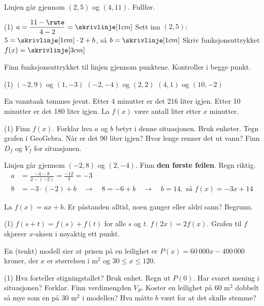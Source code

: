 Linjen går gjennom $(2, 5)$ og $(4, 11)$. Fullfør.
\begin{tasks}(1)
  \task $a = \dfrac{11 - \rute}{4 - 2} = \skrivlinje[1cm]$
  \task Sett inn $(2, 5)$: \ $5 = \skrivlinje[1cm] \cdot 2 + b$, så $b = \skrivlinje[1cm]$
  \task Skriv funksjonsuttrykket $f(x) = \skrivlinje[3cm]$
\end{tasks}


Finn funksjonsuttrykket til linjen gjennom punktene. Kontroller i begge punkt.
\begin{tasks}(1)
  \task $(-2, 9)$ og $(1, -3)$
  \task $(-2, -4)$ og $(2, 2)$
  \task $(4, 1)$ og $(10, -2)$
\end{tasks}

En vanntank tømmes jevnt. Etter 4 minutter er det 216 liter igjen. Etter 10 minutter er det 180 liter igjen.
La $f(x)$ være antall liter etter $x$ minutter.
\begin{tasks}(1)
  \task Finn $f(x)$.
  \task Forklar hva $a$ og $b$ betyr i denne situasjonen. Bruk enheter.
  \task Tegn grafen i GeoGebra. Når er det 90 liter igjen?
  \task Hvor lenge renner det ut vann? Finn $D_f$ og $V_f$ for situasjonen.
\end{tasks}

Linjen går gjennom $(-2, 8)$ og $(2, -4)$. Finn \textbf{den første feilen}. Regn riktig.
\begin{align*}
a &= \frac{-4 - 8}{2 - (-2)} = \frac{-12}{4} = -3\\
8 &= -3 \cdot (-2) + b \quad\longrightarrow\quad 8 = -6 + b \quad\longrightarrow\quad b = 14, \text{ så } f(x) = -3x + 14
\end{align*}


La $f(x) = ax + b$. Er påstanden alltid, noen ganger eller aldri sann? Begrunn.
\begin{tasks}(1)
  \task $f(s+t) = f(s) + f(t)$ for alle $s$ og $t$.
  \task $f(2x) = 2f(x)$.
  \task Grafen til $f$ skjærer $x$-aksen i nøyaktig ett punkt.
\end{tasks}

En (tenkt) modell sier at prisen på en leilighet er $P(x) = 60\,000x - 400\,000$ kroner, der $x$ er størrelsen i m$^2$ og $30 \le x \le 120$.
\begin{tasks}(1)
  \task Hva forteller stigningstallet? Bruk enhet.
  \task Regn ut $P(0)$. Har svaret mening i situasjonen? Forklar.
  \task Finn verdimengden $V_P$.
  \task Koster en leilighet på 60 m$^2$ dobbelt så mye som en på 30 m$^2$ i modellen? Hva måtte $b$ vært for at det skulle stemme?
\end{tasks}

